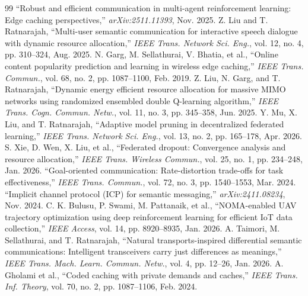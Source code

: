 \documentclass[journal]{IEEEtran}
\begin{document}
\begin{thebibliography}{99}
 ``Robust and efficient communication in multi-agent reinforcement learning: Edge caching perspectives,'' \emph{arXiv:2511.11393}, Nov. 2025.
 Z. Liu and T. Ratnarajah, ``Multi-user semantic communication for interactive speech dialogue with dynamic resource allocation,'' \emph{IEEE Trans. Network Sci. Eng.}, vol. 12, no. 4, pp. 310--324, Aug. 2025.
 N. Garg, M. Sellathurai, V. Bhatia, et al., ``Online content popularity prediction and learning in wireless edge caching,'' \emph{IEEE Trans. Commun.}, vol. 68, no. 2, pp. 1087--1100, Feb. 2019.
 Z. Liu, N. Garg, and T. Ratnarajah, ``Dynamic energy efficient resource allocation for massive MIMO networks using randomized ensembled double Q-learning algorithm,'' \emph{IEEE Trans. Cogn. Commun. Netw.}, vol. 11, no. 3, pp. 345--358, Jun. 2025.
 Y. Mu, X. Liu, and T. Ratnarajah, ``Adaptive model pruning in decentralized federated learning,'' \emph{IEEE Trans. Network Sci. Eng.}, vol. 13, no. 2, pp. 165--178, Apr. 2026.
 S. Xie, D. Wen, X. Liu, et al., ``Federated dropout: Convergence analysis and resource allocation,'' \emph{IEEE Trans. Wireless Commun.}, vol. 25, no. 1, pp. 234--248, Jan. 2026.
 ``Goal-oriented communication: Rate-distortion trade-offs for task effectiveness,'' \emph{IEEE Trans. Commun.}, vol. 72, no. 3, pp. 1540--1553, Mar. 2024.
 ``Implicit channel protocol (ICP) for semantic messaging,'' \emph{arXiv:2411.08234}, Nov. 2024.
 C. K. Bulusu, P. Swami, M. Pattanaik, et al., ``NOMA-enabled UAV trajectory optimization using deep reinforcement learning for efficient IoT data collection,'' \emph{IEEE Access}, vol. 14, pp. 8920--8935, Jan. 2026.
 A. Taimori, M. Sellathurai, and T. Ratnarajah, ``Natural transports-inspired differential semantic communications: Intelligent transceivers carry just differences as meanings,'' \emph{IEEE Trans. Mach. Learn. Commun. Netw.}, vol. 4, pp. 12--26, Jan. 2026.
 A. Gholami et al., ``Coded caching with private demands and caches,'' \emph{IEEE Trans. Inf. Theory}, vol. 70, no. 2, pp. 1087--1106, Feb. 2024.


\end{thebibliography}
\end{document}
